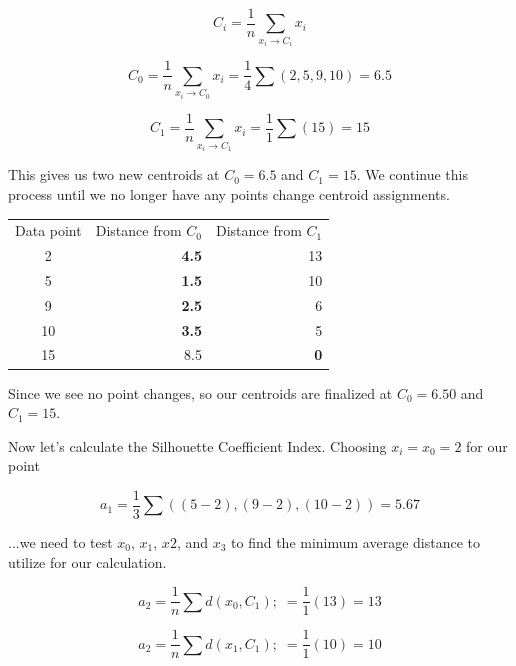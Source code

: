 \documentclass{article}
\begin{document}
\begin{equation}
    C_i = \frac{1}{n} \sum_{x_i \rightarrow C_i} x_i
\end{equation}

\begin{equation}
    C_0 = \frac{1}{n} \sum_{x_i \rightarrow C_0} x_i = \frac{1}{4} \sum (2, 5, 9, 10) = 6.5
\end{equation}

\begin{equation}
    C_1 = \frac{1}{n} \sum_{x_i \rightarrow C_1} x_i = \frac{1}{1} \sum (15) = 15
\end{equation}

\noindent This gives us two new centroids at $C_0=6.5$ and $C_1=15$. We continue this process until we no longer have any points change centroid assignments.

\begin{center}
    \begin{tabular}{c r r}
        Data point & Distance from $C_0$ & Distance from $C_1$\\
        2 & \textbf{4.5} & 13 \\
        5 & \textbf{1.5} & 10 \\
        9 & \textbf{2.5} & 6 \\
        10 & \textbf{3.5} & 5 \\
        15 & 8.5 & \textbf{0} \\
    \end{tabular}
\end{center}

\noindent Since we see no point changes, so our centroids are finalized at $C_0=6.50$ and $C_1=15$.


Now let's calculate the Silhouette Coefficient Index. Choosing $x_i=x_0=2$ for our point

\begin{equation}
    a_1 = \frac{1}{3} \sum((5-2), (9-2), (10-2)) = 5.67
\end{equation}

\noindent ...we need to test $x_0$, $x_1$, $x2$, and $x_3$ to find the minimum average distance to utilize for our calculation.

\begin{equation}
    a_2 = \frac{1}{n} \sum d(x_0, C_1); \; = \frac{1}{1} (13) = 13
\end{equation}

\begin{equation}
    a_2 = \frac{1}{n} \sum d(x_1, C_1); \; = \frac{1}{1} (10) = 10
\end{equation}
\end{document}
